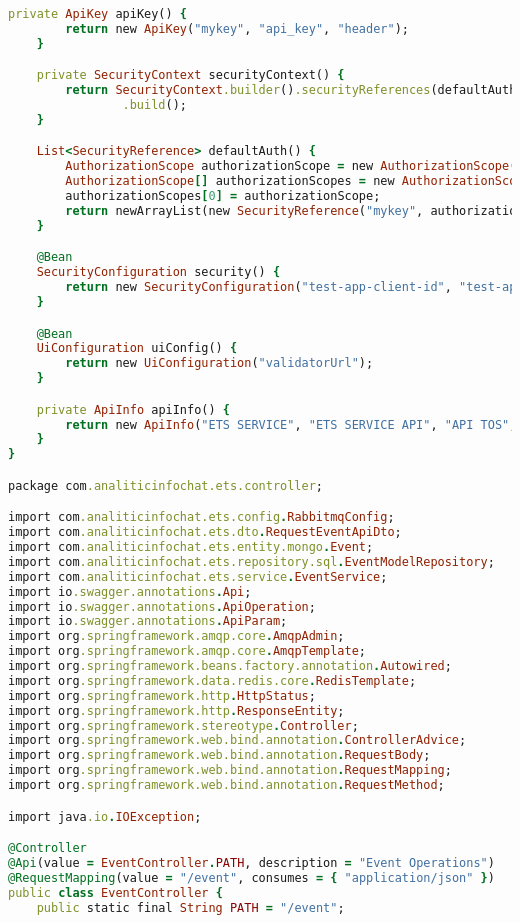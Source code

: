 \begin{lstlisting}[language=Ruby, style=rubystyle]
    private ApiKey apiKey() {
        return new ApiKey("mykey", "api_key", "header");
    }

    private SecurityContext securityContext() {
        return SecurityContext.builder().securityReferences(defaultAuth()).forPaths(PathSelectors.regex("/anyPath.*"))
                .build();
    }

    List<SecurityReference> defaultAuth() {
        AuthorizationScope authorizationScope = new AuthorizationScope("global", "accessEverything");
        AuthorizationScope[] authorizationScopes = new AuthorizationScope[1];
        authorizationScopes[0] = authorizationScope;
        return newArrayList(new SecurityReference("mykey", authorizationScopes));
    }

    @Bean
    SecurityConfiguration security() {
        return new SecurityConfiguration("test-app-client-id", "test-app-realm", "test-app", "apiKey");
    }

    @Bean
    UiConfiguration uiConfig() {
        return new UiConfiguration("validatorUrl");
    }

    private ApiInfo apiInfo() {
        return new ApiInfo("ETS SERVICE", "ETS SERVICE API", "API TOS", "aleh.sauko@gmail.com", null, null, null);
    }
}

package com.analiticinfochat.ets.controller;

import com.analiticinfochat.ets.config.RabbitmqConfig;
import com.analiticinfochat.ets.dto.RequestEventApiDto;
import com.analiticinfochat.ets.entity.mongo.Event;
import com.analiticinfochat.ets.repository.sql.EventModelRepository;
import com.analiticinfochat.ets.service.EventService;
import io.swagger.annotations.Api;
import io.swagger.annotations.ApiOperation;
import io.swagger.annotations.ApiParam;
import org.springframework.amqp.core.AmqpAdmin;
import org.springframework.amqp.core.AmqpTemplate;
import org.springframework.beans.factory.annotation.Autowired;
import org.springframework.data.redis.core.RedisTemplate;
import org.springframework.http.HttpStatus;
import org.springframework.http.ResponseEntity;
import org.springframework.stereotype.Controller;
import org.springframework.web.bind.annotation.ControllerAdvice;
import org.springframework.web.bind.annotation.RequestBody;
import org.springframework.web.bind.annotation.RequestMapping;
import org.springframework.web.bind.annotation.RequestMethod;

import java.io.IOException;

@Controller
@Api(value = EventController.PATH, description = "Event Operations")
@RequestMapping(value = "/event", consumes = { "application/json" })
public class EventController {
    public static final String PATH = "/event";


\end{lstlisting}
